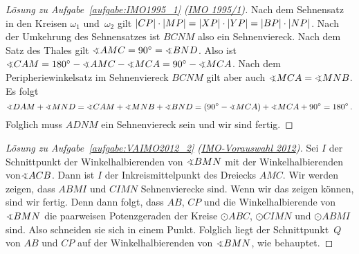 \begin{proof}[Lösung zu Aufgabe~\ref{aufgabe:IMO1995_1} \textmd{(\href{https://artofproblemsolving.com/community/c3822_1995_imo}{IMO 1995/1})}]
	Nach dem Sehnensatz in den Kreisen $\omega_1$ und~$\omega_2$ gilt $\abs*{CP}\cdot \abs*{MP}=\abs*{XP}\cdot \abs*{YP}=\abs*{BP}\cdot \abs{NP}$. Nach der Umkehrung des Sehnensatzes ist $BCNM$ also ein Sehnenviereck. Nach dem Satz des Thales gilt $\winkel AMC=90^\circ=\winkel BND$. Also ist $\winkel CAM=180^\circ-\winkel AMC-\winkel MCA=90^\circ-\winkel MCA$. Nach dem Peripheriewinkelsatz im Sehnenviereck $BCNM$ gilt aber auch $\winkel MCA=\winkel MNB$. Es folgt
	\begin{equation*}
		\winkel DAM+\winkel MND=\winkel CAM+\winkel MNB+\winkel BND=\parens*{90^\circ-\winkel MCA}+\winkel MCA+90^\circ=180^\circ\,.
	\end{equation*}
	Folglich muss $ADNM$ ein Sehnenviereck sein und wir sind fertig.
\end{proof}
\begin{proof}[Lösung zu Aufgabe~\ref{aufgabe:VAIMO2012_2} \textmd{(\href{https://www.mathe-wettbewerbe.de/fileadmin/Mathe-Wettbewerbe/AIMO/Aufgaben_und_Loesungen_AIMO/aufgaben_awb_12.pdf}{IMO-Vorauswahl 2012})}]
	Sei $I$ der Schnittpunkt der Winkelhalbierenden von $\winkel BMN$ mit der Winkelhalbierenden von$ \winkel ACB$. Dann ist $I$ der Inkreismittelpunkt des Dreiecks $AMC$. Wir werden zeigen, dass $ABMI$ und $CIMN$ Sehnenvierecke sind. Wenn wir das zeigen können, sind wir fertig. Denn dann folgt, dass $AB$, $CP$ und die Winkelhalbierende von $\winkel BMN$ die paarweisen Potenzgeraden der Kreise $\odot ABC$, $\odot CIMN$ und $\odot ABMI$ sind. Also schneiden sie sich in einem Punkt. Folglich liegt der Schnittpunkt~$Q$ von $AB$ und $CP$ auf der Winkelhalbierenden von $\winkel BMN$, wie behauptet.
	

\end{proof}
